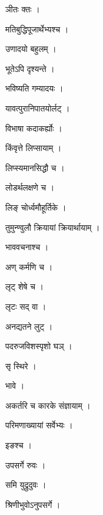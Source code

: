\documentclass[10pt, openany]{book}
\begin{document}
\noindent ञीतः क्तः ।

\noindent मतिबुद्धिपूजार्थेभ्यश्च ।

\noindent उणादयो बहुलम् ।

\noindent भूतेऽपि दृश्यन्ते ।

\noindent भविष्यति गम्यादयः ।

\noindent यावत्पुरानिपातयोर्लट् ।

\noindent विभाषा कदाकर्ह्योः ।

\noindent किंवृत्ते लिप्सायाम् ।

\noindent लिप्स्यमानसिद्धौ च ।

\noindent लोडर्थलक्षणे च ।

\noindent लिङ् चोर्ध्वमौहूर्तिके ।

\noindent तुमुन्ण्वुलौ क्रियायां क्रियार्थायाम् ।

\noindent भाववचनाश्च ।

\noindent अण् कर्मणि च ।

\noindent लृट् शेषे च ।

\noindent लृटः सद् वा ।

\noindent अनद्यतने लुट् ।

\noindent पदरुजविशस्पृशो घञ् ।

\noindent सृ स्थिरे ।

\noindent भावे ।

\noindent अकर्तरि च कारके संज्ञायाम् ।

\noindent परिमणाख्यायां सर्वेभ्यः ।

\noindent इङश्च ।

\noindent उपसर्गे रुवः ।

\noindent समि युद्रुदुवः ।

\noindent श्रिणीभुवोऽनुपसर्गे ।
\end{document}
